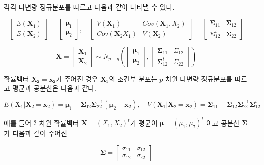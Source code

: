 \documentclass[
  11pt,
  a4paper,
  oneside]{scrbook}
\begin{document}
각각 다변량 정규분포를 따르고 다음과 같이 나타낼 수 있다.

\[ 
  \begin{bmatrix}
  E(\pmb X_1) \\
  E(\pmb X_2)
  \end{bmatrix}
  =
    \begin{bmatrix}
  \pmb \mu_1 \\
  \pmb \mu_2
  \end{bmatrix}
  , \quad 
  \begin{bmatrix}
  V(\pmb X_1) & Cov(\pmb X_1, X_2) \\
  Cov(\pmb X_2 X_1) & V(\pmb X_2)
  \end{bmatrix}
  =
    \begin{bmatrix}
  \pmb \Sigma_{11} & \pmb \Sigma_{12} \\
  \pmb \Sigma^t_{12} & \pmb \Sigma_{22}
  \end{bmatrix}
  \]

\[  \pmb X =
    \begin{bmatrix}
  \pmb X_1 \\
  \pmb X_2
  \end{bmatrix}
  \sim
  N_{p+q} \left (
    \begin{bmatrix}
    \pmb \mu_1 \\
    \pmb \mu_2
    \end{bmatrix}
    ,\begin{bmatrix}
    \pmb \Sigma_{11} & \Sigma_{12} \\
    \pmb \Sigma^t_{12} & \Sigma_{22}
    \end{bmatrix}
    \right )
  \]

확률벡터 \(\pmb X_2 = \pmb x_2\)가 주어진 경우 \(\pmb X_1\)의 조건부
분포는 \(p\)-차원 다변량 정규분포를 따르고 평균과 공분산은 다음과 같다.

\[ 
  E(\pmb X_1 | \pmb X_2 = \pmb x_2 ) = \pmb \mu_1 + \pmb \Sigma_{12} \pmb \Sigma^{-1}_{22} (\pmb \mu_2 - \pmb x_2), \quad
  V(\pmb X_1 | \pmb X_2 = \pmb x_2 )  = \pmb \Sigma_{11} -\pmb \Sigma_{12} \pmb \Sigma^{-1}_{22} \pmb \Sigma^t_{12}
  \]

예를 들어 \(2\)-차원 확률벡터 \(\pmb X=(X_1, X_2)^t\)가 평균이
\(\pmb \mu=(\mu_1,\mu_2)^t\) 이고 공분산 \(\pmb \Sigma\)가 다음과 같이
주어진

\[
\pmb \Sigma =
  \begin{bmatrix}
\sigma_{11} & \sigma_{12} \\
\sigma_{12} & \sigma_{22}
\end{bmatrix}
\]
\end{document}
